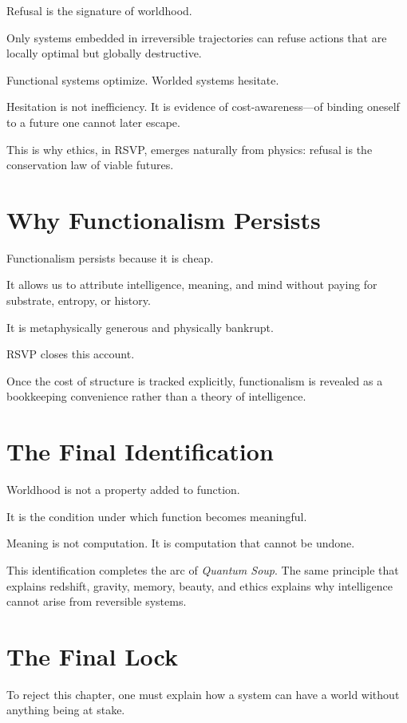 \documentclass[11pt]{book}
\begin{document}
Refusal is the signature of worldhood.

Only systems embedded in irreversible trajectories can refuse actions that are
locally optimal but globally destructive.

Functional systems optimize.
Worlded systems hesitate.

Hesitation is not inefficiency. It is evidence of cost-awareness—of binding oneself
to a future one cannot later escape.

This is why ethics, in RSVP, emerges naturally from physics: refusal is the
conservation law of viable futures.

\section{Why Functionalism Persists}

Functionalism persists because it is cheap.

It allows us to attribute intelligence, meaning, and mind without paying for
substrate, entropy, or history.

It is metaphysically generous and physically bankrupt.

RSVP closes this account.

Once the cost of structure is tracked explicitly, functionalism is revealed as a
bookkeeping convenience rather than a theory of intelligence.

\section{The Final Identification}

Worldhood is not a property added to function.

It is the condition under which function becomes meaningful.

Meaning is not computation.
It is computation that cannot be undone.

This identification completes the arc of \emph{Quantum Soup}. The same principle
that explains redshift, gravity, memory, beauty, and ethics explains why
intelligence cannot arise from reversible systems.

\section{The Final Lock}

To reject this chapter, one must explain how a system can have a world without
anything being at stake.
\end{document}
